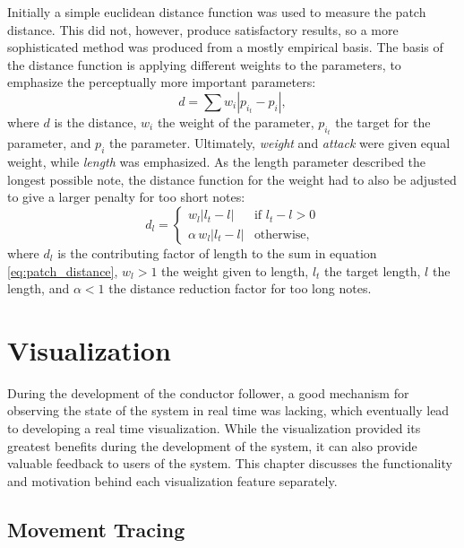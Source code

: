 Initially a simple euclidean distance function
was used to measure the patch distance.
This did not, however, produce satisfactory results,
so a more sophisticated method was
produced from a mostly empirical basis.
The basis of the distance function is applying
different weights to the parameters,
to emphasize the perceptually more important parameters:
\begin{equation}
d = \sum w_i \left \vert p_{i_t} - p_i \right \vert,
\label{eq:patch_distance}
\end{equation}
where $d$ is the distance,
$w_i$ the weight of the \nth[i] parameter,
$p_{i_t}$ the target for the \nth[i] parameter,
and $p_i$ the \nth[i] parameter.
Ultimately, \textit{weight} and \textit{attack}
were given equal weight,
while \textit{length} was emphasized.
As the length parameter described the
longest possible note,
the distance function for the weight had to also be adjusted
to give a larger penalty for too short notes:
\begin{equation}
d_l =
\begin{cases}
w_l \left \vert l_t - l \right \vert & \text{if } l_t - l > 0 \\
\alpha \, w_l \left \vert l_t - l \right \vert & \text{otherwise},
\end{cases}
\end{equation}
where $d_l$ is the contributing factor of length
to the sum in equation \ref{eq:patch_distance},
$w_l > 1$ the weight given to length,
$l_t$ the target length,
$l$ the length,
and $\alpha < 1$ the distance reduction factor for too long notes.


\chapter{Visualization}
\label{chapter:visualization}

During the development of the conductor follower,
a good mechanism for observing the state of the system
in real time was lacking,
which eventually lead to developing a real time visualization.
While the visualization provided its greatest benefits
during the development of the system,
it can also provide valuable feedback to users of the system.
This chapter discusses the functionality
and motivation behind each visualization feature separately.

\section{Movement Tracing}

